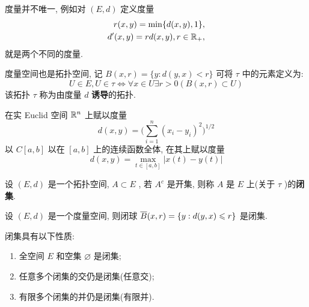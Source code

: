    \begin{Remark}\label{rmk:度量不唯一}
       度量并不唯一, 例如对 $ (E, d) $ 定义度量
       \begin{equation*}
          \begin{aligned}
             r(x, y) = \min\{ d(x, y), 1 \}, \\
             d'(x, y) = rd(x, y), r\in\R_{+},
          \end{aligned}
       \end{equation*}
       就是两个不同的度量.
    \end{Remark}

    度量空间也是拓扑空间, 记 $ B(x, r)=\{ y: d(y, x)<r \} $ 可将 $ \tau $ 中的元素定义为:
    \[
       U\in E, U\in \tau\Leftrightarrow \forall x\in U\exists r>0(B(x, r)\subset U)
    \]
    该拓扑 $ \tau $ 称为由度量 $ d $ \textbf{诱导}的拓扑.

    \begin{Example}
       在实 Euclid 空间 $ \R^{n} $ 上赋以度量
       \begin{equation}
          d(x, y)=\bigg( \sum_{i=1}^{n}(x_{i}-y_{i})^{2} \bigg)^{1/2}\tag{Euclid距离}
       \end{equation}
       以 $ C[a, b] $ 以在 $ [a, b] $ 上的连续函数全体, 在其上赋以度量
        \begin{equation}
          d(x, y) = \max_{t\in [a, b]} |x(t)-y(t)|\tag{一致距离}
       \end{equation}
    \end{Example}

    \begin{Definition}[闭集]\label{def:闭集}
       设 $ (E, d) $ 是一个拓扑空间, $ A\subset E $ , 若 $ A^{c} $ 是开集, 则称 $ A $ 是 $ E $ 上(关于 $ \tau $ )的\textbf{闭集}.
    \end{Definition}
    \begin{Example}
       设 $ (E, d) $ 是一个度量空间, 则闭球 $ \baro{B}(x, r)=\{ y: d(y, x)\leqslant r \} $ 是闭集.
    \end{Example}
    \begin{Proposition}\label{prop:闭集的性质}
       闭集具有以下性质:
       \begin{enumerate}[(1)]
          \item 全空间 $ E $ 和空集 $ \varnothing $ 是闭集;
          \item 任意多个闭集的交仍是闭集(任意交);
          \item 有限多个闭集的并仍是闭集(有限并).
       \end{enumerate}
    \end{Proposition}

